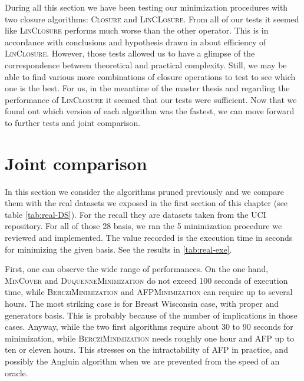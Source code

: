\vspace{1.2em}

During all this section we have been testing our minimization procedures with two closure algorithms: \textsc{Closure} and \textsc{LinCLosure}. From all of
our tests it seemed like \textsc{LinClosure} performs much worse than the 
other operator. This is in accordance with conclusions and hypothesis drawn in
\cite{bazhanov_optimizations_2014} about efficiency of \textsc{LinClosure}. However, those tests allowed us to have a glimpse of the correspondence between
theoretical and practical complexity. Still, we may be able to find various more combinations of closure operations to test to see which one is the best. For us, in the meantime of the master thesis and regarding the performance of \textsc{LinClosure} it seemed that our tests were sufficient. Now that we found out which version of each algorithm was the fastest, we can move forward to 
further tests and joint comparison.


\section{Joint comparison}

In this section we consider the algorithms pruned previously and we compare them
with the real datasets we exposed in the first section of this chapter (see table \ref{tab:real-DS}). For the recall they are datasets taken from the UCI 
repository. For all of those 28 basis, we ran the 5 minimization procedure
we reviewed and implemented. The value recorded is the execution time in seconds
for minimizing the given basis. See the results in \ref{tab:real-exe}.

\vspace{1.2em}

First, one can observe the wide range of performances. On the one hand,
\textsc{MinCover} and \textsc{DuquenneMinimization} do not exceed 100 seconds of execution time, while \textsc{BercziMinimization} and \textsc{AFPMinimization} can require up to several hours. The most striking
case is for Breast Wisconsin case, with proper and generators basis. This is
probably because of the number of implications in those cases. Anyway, while
the two first algorithms require about 30 to 90 seconds for minimization, while
\textsc{BercziMinimization} needs roughly one hour and \textsc{AFP} up to ten or eleven hours. This stresses on the intractability of \textsc{AFP} in practice, and possibly the Angluin algorithm when we are prevented from the speed of an oracle.

